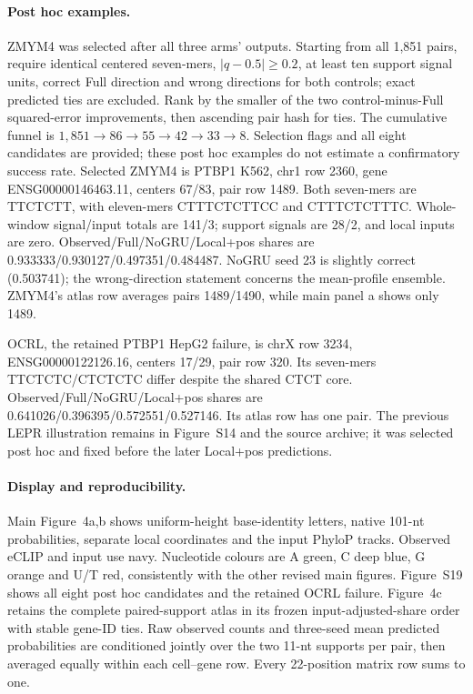 \documentclass[11pt]{article}
\begin{document}
\paragraph{Post hoc examples.} ZMYM4 was selected after all three arms' outputs. Starting from all 1,851 pairs, require identical centered seven-mers, $|q-0.5|\geq0.2$, at least ten support signal units, correct Full direction and wrong directions for both controls; exact predicted ties are excluded. Rank by the smaller of the two control-minus-Full squared-error improvements, then ascending pair hash for ties. The cumulative funnel is $1,851\to86\to55\to42\to33\to8$. Selection flags and all eight candidates are provided; these post hoc examples do not estimate a confirmatory success rate. Selected ZMYM4 is PTBP1 K562, chr1 row 2360, gene ENSG00000146463.11, centers 67/83, pair row 1489. Both seven-mers are TTCTCTT, with eleven-mers CTTTCTCTTCC and CTTTCTCTTTC. Whole-window signal/input totals are 141/3; support signals are 28/2, and local inputs are zero. Observed/Full/NoGRU/Local+pos shares are 0.933333/0.930127/0.497351/0.484487. NoGRU seed 23 is slightly correct (0.503741); the wrong-direction statement concerns the mean-profile ensemble. ZMYM4's atlas row averages pairs 1489/1490, while main panel a shows only 1489.

OCRL, the retained PTBP1 HepG2 failure, is chrX row 3234, ENSG00000122126.16, centers 17/29, pair row 320. Its seven-mers TTCTCTC/CTCTCTC differ despite the shared CTCT core. Observed/Full/NoGRU/Local+pos shares are 0.641026/0.396395/0.572551/0.527146. Its atlas row has one pair. The previous LEPR illustration remains in Figure~S14 and the source archive; it was selected post hoc and fixed before the later Local+pos predictions.

\paragraph{Display and reproducibility.} Main Figure~4a,b shows uniform-height base-identity letters, native 101-nt probabilities, separate local coordinates and the input PhyloP tracks. Observed eCLIP and input use navy. Nucleotide colours are A green, C deep blue, G orange and U/T red, consistently with the other revised main figures. Figure~S19 shows all eight post hoc candidates and the retained OCRL failure. Figure~4c retains the complete paired-support atlas in its frozen input-adjusted-share order with stable gene-ID ties. Raw observed counts and three-seed mean predicted probabilities are conditioned jointly over the two 11-nt supports per pair, then averaged equally within each cell--gene row. Every 22-position matrix row sums to one.
\end{document}
